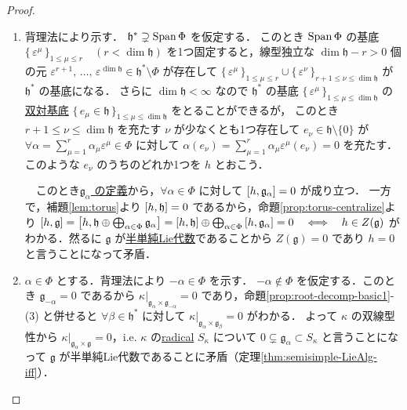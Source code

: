 \documentclass[rep_main]{subfiles}
\begin{document}
\begin{proof}
	\begin{enumerate}
		\item 背理法により示す．
		$\mathfrak{h}^* \supsetneq \operatorname{Span} \Phi$ を仮定する．
		このとき $\operatorname{Span} \Phi$ の基底 $\bigl\{\,\varepsilon^\mu\,\bigr\}_{1 \le \mu \le r}\quad (r < \dim \mathfrak{h})$ を1つ固定すると，線型独立な $\dim \mathfrak{h} - r > 0$ 個の元 $\varepsilon^{r+1},\, \dots,\, \varepsilon^{\dim \mathfrak{h}} \in \mathfrak{h}^* \setminus \Phi$ が存在して $\bigl\{\,\varepsilon^\mu\,\bigr\}_{1 \le \mu \le r} \cup \bigl\{\, \varepsilon^\nu\,\bigr\}_{r+1 \le \nu \le \dim \mathfrak{h}}$ が $\mathfrak{h}^*$ の基底になる．
		さらに $\dim \mathfrak{h} < \infty$ なので $\mathfrak{h}^*$ の基底 $\bigl\{\, \varepsilon^\mu\,\bigr\}_{1 \le \mu \le \dim \mathfrak{h}}$ の\hyperref[prop:dual-basis]{双対基底} $\bigl\{\, e_\mu \in \mathfrak{h} \,\bigr\}_{1 \le \mu \le \dim \mathfrak{h}}$ をとることができるが，
		このとき $r + 1\le \nu \le \dim \mathfrak{h}$ を充たす $\nu$ が少なくとも1つ存在して $e_\nu \in \mathfrak{h} \setminus \{0\}$ が $\forall \alpha = \sum_{\mu = 1}^r\alpha_\mu \varepsilon^\mu \in \Phi$ に対して $\alpha(e_\nu) = \sum_{\mu = 1}^r\alpha_\mu　\varepsilon^\mu(e_\nu) = 0$ を充たす．
		このような $e_\nu$ のうちのどれか1つを $h$ とおこう．

		　このとき\hyperref[def:ga]{$\mathfrak{g}_\alpha$ の定義}から，$\forall \alpha \in \Phi$ に対して $\comm{h}{\mathfrak{g}_\alpha} = 0$ が成り立つ．
		一方で，補題\ref{lem:torus}より $\comm{h}{\mathfrak{h}} = 0$ であるから，命題\ref{prop:torus-centralize}より $\comm{h}{\mathfrak{g}} = \comm{h}{\mathfrak{h} \oplus \bigoplus_{\alpha \in \Phi} \mathfrak{g}_\alpha} = \comm{h}{\mathfrak{h}} \oplus \bigoplus_{\alpha \in \Phi} \comm{h}{\mathfrak{g}_\alpha} = 0 \IFF h \in Z(\mathfrak{g})$ がわかる．然るに $\mathfrak{g}$ が\hyperref[def:semisimple-LieAlg]{半単純Lie代数}であることから $Z(\mathfrak{g}) = 0$ であり $h = 0$ と言うことになって矛盾．

		\item $\alpha \in \Phi$ とする．背理法により $-\alpha \in \Phi$ を示す．
		$-\alpha \notin \Phi$ を仮定する．このとき $\mathfrak{g}_{-\alpha} = 0$ であるから $\kappa|_{\mathfrak{g}_\alpha \times \mathfrak{g}_{-\alpha}} = 0$ であり，命題\ref{prop:root-decomp-basic1}-(3) と併せると $\forall \beta \in \mathfrak{h}^*$ に対して $\kappa|_{\mathfrak{g}_\alpha \times \mathfrak{g}_\beta} = 0$ がわかる．
		よって $\kappa$ の双線型性から $\kappa|_{\mathfrak{g}_\alpha \times \mathfrak{g}} = 0$，i.e. $\kappa$ の\hyperref[def:radical-bilinear]{radical} $S_\kappa$ について $0 \subsetneq \mathfrak{g}_\alpha \subset S_\kappa$ と言うことになって $\mathfrak{g}$ が半単純Lie代数であることに矛盾（定理\ref{thm:semisimple-LieAlg-iff}）．


\end{enumerate}
\end{proof}
\end{document}
